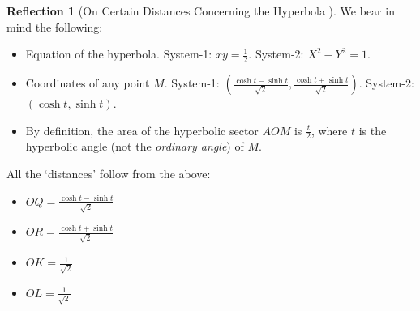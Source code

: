 \documentclass[11pt]{article}
\theoremstyle{definition}
\theoremstyle{plain}
\theoremstyle{problemstyle}
\theoremstyle{remark}
\theoremstyle{definition}
\newtheorem{reflection}{Reflection}
\begin{document}
\begin{reflection}[On Certain Distances Concerning the Hyperbola \cite{desmos-hyperbolic-distances}]
    We bear in mind the following:
    \begin{itemize}
        \item Equation of the hyperbola. System-1: $xy=\frac{1}{2}$. System-2: $X^2-Y^2=1$.
        \item Coordinates of any point $M$. System-1: $(\frac{\cosh{t}-\sinh{t}}{\sqrt{2}},\frac{\cosh{t}+\sinh{t}}{\sqrt{2}})$. System-2: $(\cosh{t},\sinh{t})$.
        \item By definition, the area of the hyperbolic sector $AOM$ is $\frac{t}{2}$, where $t$ is the hyperbolic angle (not the \emph{ordinary angle}) of $M$.
    \end{itemize}

    All the `distances' follow from the above:
    \begin{itemize}
        \item $OQ=\frac{\cosh{t}-\sinh{t}}{\sqrt{2}}$
        \item $OR=\frac{\cosh{t}+\sinh{t}}{\sqrt{2}}$
        \item $OK=\frac{1}{\sqrt{2}}$
        \item $OL=\frac{1}{\sqrt{2}}$
    \end{itemize}
\end{reflection}
\end{document}

